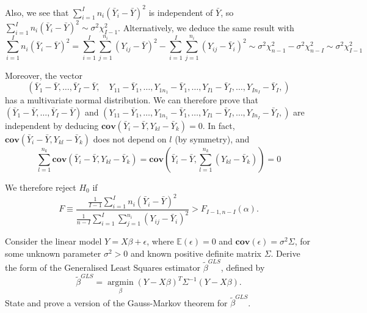 Also, we see that $\sum^I_{i=1} n_i\left(\bar{Y}_i - \bar{Y}\right)^2$ is independent of $\bar{Y}$, so $\sum^I_{i=1} n_i\left(\bar{Y}_i - \bar{Y}\right)^2 \sim \sigma^2\chi_{I-1}^2$. Alternatively, we deduce the same result with
\begin{equation}
\sum^I_{i=1} n_i\left(\bar{Y}_i - \bar{Y}\right)^2 = \sum^I_{i=1}\sum^{n_i}_{j=1}\left(Y_{ij}-\bar{Y}\right)^2 - \sum^I_{i=1}\sum^{n_i}_{j=1}\left(Y_{ij} -\bar{Y}_i\right)^2 \sim \sigma^2\chi_{n-1}^2 -\sigma^2\chi_{n-I}^2  \sim \sigma^2\chi_{I-1}^2
\end{equation}

Moreover, the vector
\begin{equation}
\left(\bar{Y}_1 - \bar{Y}, \dots, \bar{Y}_I - \bar{Y}, \quad Y_{11} - \bar{Y}_1,\dots,Y_{1n_1} - \bar{Y}_1,\dots, Y_{I1} - \bar{Y}_I, \dots, Y_{In_I} - \bar{Y}_I,\right)
\end{equation}
has a multivariate normal distribution. We can therefore prove that $\left(\bar{Y}_1 - \bar{Y}, \dots, \bar{Y}_I - \bar{Y}\right)$ and $\left(Y_{11} - \bar{Y}_1,\dots,Y_{1n_1} - \bar{Y}_1,\dots, Y_{I1} - \bar{Y}_I, \dots, Y_{In_I} - \bar{Y}_I,\right)$ are independent by deducing $\mathbf{cov}\left(\bar{Y}_i - \bar{Y}, Y_{kl} - \bar{Y}_k\right)=0$. In fact, $\mathbf{cov}\left(\bar{Y}_i - \bar{Y}, Y_{kl} - \bar{Y}_k\right)$ does not depend on $l$ (by symmetry), and
\begin{equation}
\sum^{n_k}_{l=1}\mathbf{cov}\left(\bar{Y}_i - \bar{Y}, Y_{kl} - \bar{Y}_k\right) = \mathbf{cov}\left(\bar{Y}_i - \bar{Y}, \sum^{n_k}_{l=1}(Y_{kl} - \bar{Y}_k)\right)=0
\end{equation}

We therefore reject $H_0$ if
\begin{equation}
F\equiv \frac{\frac{1}{I-1}\sum^I_{i=1} n_i\left(\bar{Y}_i - \bar{Y}\right)^2}{\frac{1}{n-I}\sum^I_{i=1}\sum^{n_i}_{j=1}\left(Y_{ij} -\bar{Y}_i\right)^2} > F_{I-1,n-I}(\alpha).
\end{equation}





\item Consider the linear model $Y=X\beta+\epsilon$, where $\mathbb{E}(\epsilon)=0$ and $\mathbf{cov}(\epsilon)=\sigma^2\Sigma$, for some unknown parameter $\sigma^2>0$ and known positive definite matrix $\Sigma$. Derive the form of the Generalised Least Squares estimator $\tilde{\beta}^{GLS}$, defined by
\begin{equation}
\tilde{\beta}^{GLS}=\underset{\beta}{\operatorname{argmin}}(Y-X\beta)^T\Sigma^{-1}(Y-X\beta).
\end{equation}
State and prove a version of the Gauss-Markov theorem for $\tilde{\beta}^{GLS}$.



